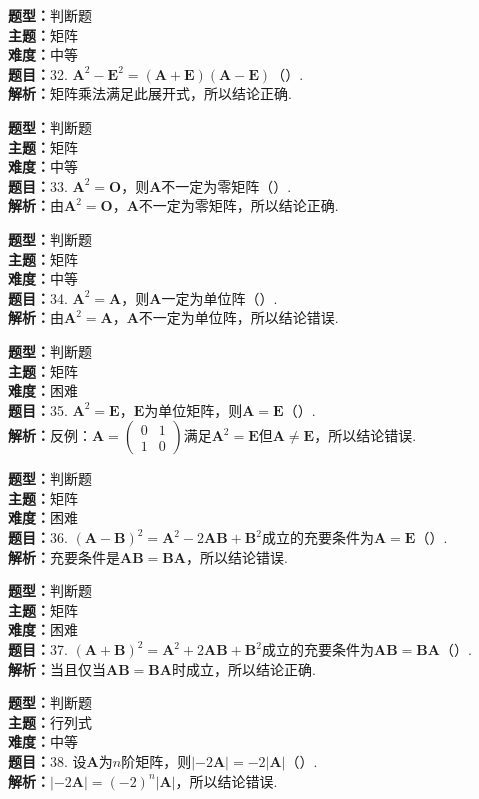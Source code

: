 \documentclass{ctexart}
\newenvironment{question}[5]{%
	\noindent\textbf{题型：}#1\\
	\textbf{主题：}#2\\
	\textbf{难度：}#3\\
	\textbf{题目：}#4\\
	\textbf{解析：}#5\\
	\vspace{1em}
}{}
\begin{document}
	\begin{question}
		{判断题}
		{矩阵}
		{中等}
		{32. \(\mathbf{A}^2-\mathbf{E}^2=(\mathbf{A}+\mathbf{E})(\mathbf{A}-\mathbf{E})\)（）.}
		{矩阵乘法满足此展开式，所以结论正确.}
	\end{question}
	
	\begin{question}
		{判断题}
		{矩阵}
		{中等}
		{33. \(\mathbf{A}^2=\mathbf{O}\)，则\(\mathbf{A}\)不一定为零矩阵（）.}
		{由\(\mathbf{A}^2=\mathbf{O}\)，\(\mathbf{A}\)不一定为零矩阵，所以结论正确.}
	\end{question}
	
	\begin{question}
		{判断题}
		{矩阵}
		{中等}
		{34. \(\mathbf{A}^2=\mathbf{A}\)，则\(\mathbf{A}\)一定为单位阵（）.}
		{由\(\mathbf{A}^2=\mathbf{A}\)，\(\mathbf{A}\)不一定为单位阵，所以结论错误.}
	\end{question}
	
	\begin{question}
		{判断题}
		{矩阵}
		{困难}
		{35. \(\mathbf{A}^2=\mathbf{E}\)，\(\mathbf{E}\)为单位矩阵，则\(\mathbf{A}=\mathbf{E}\)（）.}
		{反例：\(\mathbf{A}=\left(\begin{array}{ll}0 & 1 \\ 1 & 0\end{array}\right)\)满足\(\mathbf{A}^2=\mathbf{E}\)但\(\mathbf{A}\neq\mathbf{E}\)，所以结论错误.}
	\end{question}
	
	\begin{question}
		{判断题}
		{矩阵}
		{困难}
		{36. \((\mathbf{A}-\mathbf{B})^2=\mathbf{A}^2-2\mathbf{AB}+\mathbf{B}^2\)成立的充要条件为\(\mathbf{A}=\mathbf{E}\)（）.}
		{充要条件是\(\mathbf{AB}=\mathbf{BA}\)，所以结论错误.}
	\end{question}
	
	\begin{question}
		{判断题}
		{矩阵}
		{困难}
		{37. \((\mathbf{A}+\mathbf{B})^2=\mathbf{A}^2+2\mathbf{AB}+\mathbf{B}^2\)成立的充要条件为\(\mathbf{AB}=\mathbf{BA}\)（）.}
		{当且仅当\(\mathbf{AB}=\mathbf{BA}\)时成立，所以结论正确.}
	\end{question}
	
	\begin{question}
		{判断题}
		{行列式}
		{中等}
		{38. 设\(\mathbf{A}\)为\(n\)阶矩阵，则\(|-2\mathbf{A}|=-2|\mathbf{A}|\)（）.}
		{\(|-2\mathbf{A}|=(-2)^n|\mathbf{A}|\)，所以结论错误.}
	\end{question}
	
\end{document}
